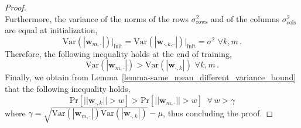 \begin{proof}
\begin{equation}
\end{equation}
%
Furthermore, the variance of the norms of the rows $\sigma_\text{rows}^2$ and of the columns $\sigma_\text{cols}^2$ are equal at initialization, 
%
\begin{equation}
    \text{Var}\left(|\bm{w}_{m, \cdot}|\right)\bigg|_{\text{init}} = \text{Var}\left(|\bm{w}_{\cdot, k, \cdot}|\right)\bigg|_{\text{init}} =\sigma^2 \,\, \forall k,m\,.
\end{equation}
%
Therefore, the following inequality holds at the end of training,
%
\begin{equation}
    \text{Var}\left(|\bm{w}_{m, \cdot}|\right) > \text{Var}\left(|\bm{w}_{ \cdot, k}|\right) \,\, \forall k,m \,.
\end{equation}
%
Finally, we obtain from Lemma~\ref{lemma-same_mean_different_variance_bound} that the following inequality holds,
%
\begin{equation}
    \text{Pr}[||\bm{w}_{\cdot, k}|| > w] > \text{Pr}[|| \bm{w}_{m, \cdot}|| > w] \,\,\ \forall \,w > \gamma
\end{equation}
%
where $\gamma = \sqrt{\text{Var}\left(|\bm{w}_{m, \cdot}|\right)\text{Var}\left(|\bm{w}_{\cdot, k}|\right)}-\mu $, thus concluding the proof.
%
%
%
\end{proof}